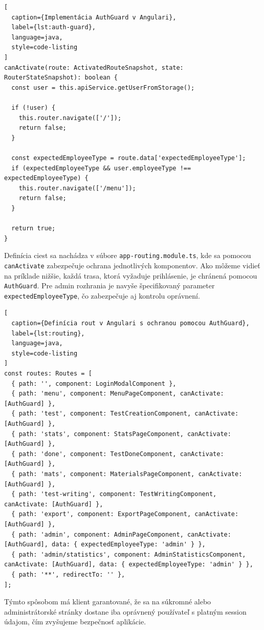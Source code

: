 \begin{lstlisting}[
  caption={Implementácia AuthGuard v Angulari},
  label={lst:auth-guard},
  language=java,
  style=code-listing
]
canActivate(route: ActivatedRouteSnapshot, state: RouterStateSnapshot): boolean {
  const user = this.apiService.getUserFromStorage();

  if (!user) {
    this.router.navigate(['/']);
    return false;
  }

  const expectedEmployeeType = route.data['expectedEmployeeType'];
  if (expectedEmployeeType && user.employeeType !== expectedEmployeeType) {
    this.router.navigate(['/menu']);
    return false;
  }

  return true;
}
\end{lstlisting}

Definícia ciest sa nachádza v súbore \texttt{app-routing.module.ts}, kde sa pomocou \texttt{canActivate} zabezpečuje ochrana jednotlivých komponentov. Ako môžeme vidieť na príklade nižšie, každá trasa, ktorá vyžaduje prihlásenie, je chránená pomocou \texttt{AuthGuard}. Pre admin rozhrania je navyše špecifikovaný parameter \texttt{expectedEmployeeType}, čo zabezpečuje aj kontrolu oprávnení.

\begin{lstlisting}[
  caption={Definícia rout v Angulari s ochranou pomocou AuthGuard},
  label={lst:routing},
  language=java,
  style=code-listing
]
const routes: Routes = [
  { path: '', component: LoginModalComponent },
  { path: 'menu', component: MenuPageComponent, canActivate: [AuthGuard] },
  { path: 'test', component: TestCreationComponent, canActivate: [AuthGuard] },
  { path: 'stats', component: StatsPageComponent, canActivate: [AuthGuard] },
  { path: 'done', component: TestDoneComponent, canActivate: [AuthGuard] },
  { path: 'mats', component: MaterialsPageComponent, canActivate: [AuthGuard] },
  { path: 'test-writing', component: TestWritingComponent, canActivate: [AuthGuard] },
  { path: 'export', component: ExportPageComponent, canActivate: [AuthGuard] },
  { path: 'admin', component: AdminPageComponent, canActivate: [AuthGuard], data: { expectedEmployeeType: 'admin' } },
  { path: 'admin/statistics', component: AdminStatisticsComponent, canActivate: [AuthGuard], data: { expectedEmployeeType: 'admin' } },
  { path: '**', redirectTo: '' },
];
\end{lstlisting}

Týmto spôsobom má klient garantované, že sa na súkromné alebo administrátorské stránky dostane iba oprávnený používateľ s platným session údajom, čím zvyšujeme bezpečnosť aplikácie.

